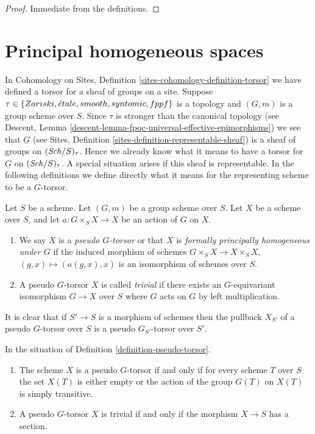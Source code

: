 \begin{proof}
Immediate from the definitions.
\end{proof}






\section{Principal homogeneous spaces}
\label{section-principal-homogeneous}

\noindent
In
Cohomology on Sites, Definition \ref{sites-cohomology-definition-torsor}
we have defined a torsor for a sheaf of groups on a site.
Suppose $\tau \in \{Zariski, {\acute{e}tale}, smooth, syntomic, fppf\}$ is a
topology and $(G, m)$ is a group scheme over $S$. Since $\tau$ is stronger than
the canonical topology (see
Descent, Lemma \ref{descent-lemma-fpqc-universal-effective-epimorphisms})
we see that $\underline{G}$ (see
Sites, Definition \ref{sites-definition-representable-sheaf})
is a sheaf of groups on $(\mathit{Sch}/S)_\tau$.
Hence we already know what it means to have a
torsor for $\underline{G}$ on $(\mathit{Sch}/S)_\tau$. A special situation
arises if this sheaf is representable. In the following definitions
we define directly what it means for the representing scheme to be a
$G$-torsor.

\begin{definition}
\label{definition-pseudo-torsor}
Let $S$ be a scheme.
Let $(G, m)$ be a group scheme over $S$.
Let $X$ be a scheme over $S$, and let
$a : G \times_S X \to X$ be an action of $G$ on $X$.
\begin{enumerate}
\item We say $X$ is a {\it pseudo $G$-torsor} or that $X$ is
{\it formally principally homogeneous under $G$} if the induced
morphism of schemes $G \times_S X \to X \times_S X$,
$(g, x) \mapsto (a(g, x), x)$ is an isomorphism of schemes over $S$.
\item A pseudo $G$-torsor $X$ is called {\it trivial} if there exists
an $G$-equivariant isomorphism $G \to X$ over $S$ where $G$ acts on
$G$ by left multiplication.
\end{enumerate}
\end{definition}

\noindent
It is clear that if $S' \to S$ is a morphism of schemes then
the pullback $X_{S'}$ of a pseudo $G$-torsor over $S$ is a
pseudo $G_{S'}$-torsor over $S'$.

\begin{lemma}
\label{lemma-characterize-trivial-pseudo-torsors}
In the situation of
Definition \ref{definition-pseudo-torsor}.
\begin{enumerate}
\item The scheme $X$ is a pseudo $G$-torsor if and only if for every scheme
$T$ over $S$ the set $X(T)$ is either empty or the action of the group $G(T)$
on $X(T)$ is simply transitive.
\item A pseudo $G$-torsor $X$ is trivial if and only if the morphism
$X \to S$ has a section.
\end{enumerate}
\end{lemma}

